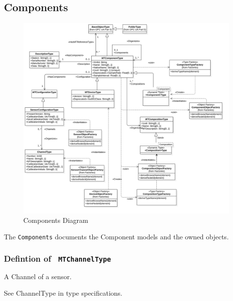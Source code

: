 \subsection{Components} \label{model:Components}

\begin{figure}[ht]
  \centering
    \includegraphics[width=1.0\textwidth]{./diagrams/Components.png}
  \caption{Components Diagram}
  \label{fig:Components}
\end{figure}

\FloatBarrier


The \texttt{Components} documents the Component models and the owned objects.

\subsubsection{Defintion of \texttt{ MTChannelType}}
  \label{type:MTChannelType}

\FloatBarrier

A Channel of a sensor.

See ChannelType in type specifications.




